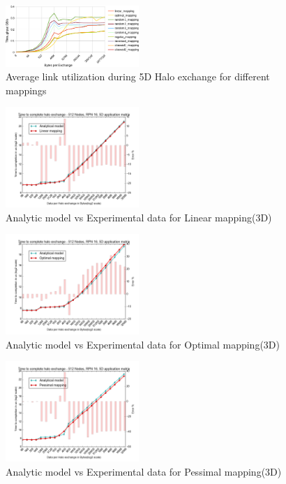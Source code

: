 \documentclass{acm_proc_article-sp}
\begin{document}
\begin{figure}
  \center
  \includegraphics[width=0.45\textwidth]{fig/TEST_RPN_16_NODE_512_5D_LINK_UTIL}
  \caption{Average link utilization during 5D Halo exchange for different
          mappings
    \label{fig:TEST_RPN_16_NODE_512_5D_LINK_UTIL}}
\end{figure}

\clearpage
\begin{figure}
  \center
  \includegraphics[width=0.45\textwidth]{mappings/3d_linear.png}
  \caption{Analytic model vs Experimental data for Linear mapping(3D)}
    \label{fig:3D_linear_mapping}
\end{figure}

\begin{figure}
  \center
  \includegraphics[width=0.45\textwidth]{mappings/3d_optimal.png}
  \caption{Analytic model vs Experimental data for Optimal mapping(3D)}
    \label{fig:3D_optimal_mapping}
\end{figure}

\begin{figure}
  \center
  \includegraphics[width=0.45\textwidth]{mappings/3d_pessimal.png}
  \caption{Analytic model vs Experimental data for Pessimal mapping(3D)}
    \label{fig:3D_pessimal_mapping}
\end{figure}
\end{document}
